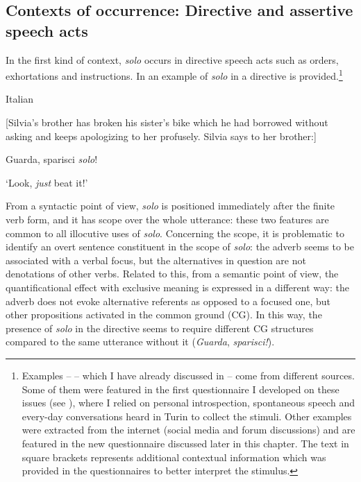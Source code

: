 \subsection{Contexts of occurrence: Directive and assertive speech acts}
\hypertarget{Toc124860670}{}
In the first kind of context, \textit{solo} occurs in directive speech acts such as orders, exhortations and instructions. In  an example of \textit{solo} in a directive is provided.\footnote{Examples -- – which I have already discussed in \citet{Favaro2020} – come from different sources. Some of them were featured in the first questionnaire I developed on these issues (see \citealt{Favaro2019}), where I relied on personal introspection, spontaneous speech and every-day conversations heard in Turin to collect the stimuli. Other examples were extracted from the internet (social media and forum discussions) and are featured in the new questionnaire discussed later in this chapter. The text in square brackets represents additional contextual information which was provided in the questionnaires to better interpret the stimulus.}

\ea%
    \label{ex:key:91}

          Italian \citep[121]{Favaro2020}

[Silvia’s brother has broken his sister’s bike which he had borrowed without asking and keeps apologizing to her profusely. Silvia says to her brother:]

  Guarda, sparisci \textit{solo}!

\glt ‘Look, \textit{just} beat it!’
    \z %

From a syntactic point of view, \textit{solo} is positioned immediately after the finite verb form, and it has scope over the whole utterance: these two features are common to all illocutive uses of \textit{solo}. Concerning the scope, it is problematic to identify an overt sentence constituent in the scope of \textit{solo}: the adverb seems to be associated with a verbal focus, but the alternatives in question are not denotations of other verbs. Related to this, from a semantic point of view, the quantificational effect with exclusive meaning is expressed in a different way: the adverb does not evoke alternative referents as opposed to a focused one, but other propositions activated in the common ground (CG). In this way, the presence of \textit{solo} in the directive seems to require different CG structures compared to the same utterance without it (\textit{Guarda}, \textit{sparisci!}).

